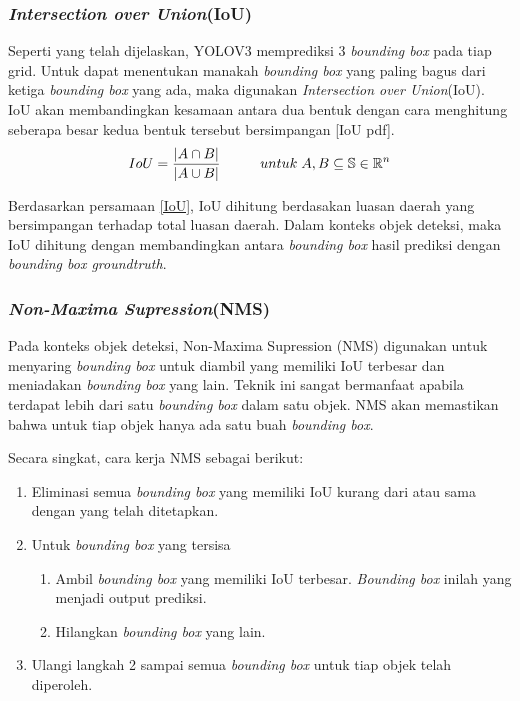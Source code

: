 \documentclass[../thesis.tex]{subfiles}
\begin{document}
\subsubsection{\textit{Intersection over Union}(IoU)}
Seperti yang telah dijelaskan, YOLOV3 memprediksi 3 \textit{bounding box} pada tiap grid. Untuk dapat menentukan manakah \textit{bounding box} yang paling bagus dari ketiga \textit{bounding box} yang ada, maka digunakan \textit{Intersection over Union}(IoU). 
IoU akan membandingkan kesamaan antara dua bentuk dengan cara menghitung seberapa besar kedua bentuk tersebut bersimpangan [IoU pdf].
\begin{equation} \label{IoU}
	IoU = \frac{|A \cap B|}{|A \cup B|}	\hspace{10mm} untuk \hspace{1mm}A,B \subseteq \mathbb{S} \in \mathbb{R}^n
\end{equation}

Berdasarkan persamaan \ref{IoU}, IoU dihitung berdasakan luasan daerah yang bersimpangan terhadap total luasan daerah.
Dalam konteks objek deteksi, maka IoU dihitung dengan membandingkan antara \textit{bounding box} hasil prediksi dengan \textit{bounding box groundtruth}.

\subsubsection{\textit{Non-Maxima Supression}(NMS)}
Pada konteks objek deteksi, Non-Maxima Supression (NMS) digunakan untuk menyaring \textit{bounding box} untuk diambil yang memiliki IoU terbesar dan meniadakan \textit{bounding box} yang lain. 
Teknik ini sangat bermanfaat apabila terdapat lebih dari satu \textit{bounding box} dalam satu objek. NMS akan memastikan bahwa untuk tiap objek hanya ada satu buah \textit{bounding box}. 

Secara singkat, cara kerja NMS sebagai berikut:
\begin{enumerate}
	\item Eliminasi semua \textit{bounding box} yang memiliki IoU kurang dari atau sama dengan yang telah ditetapkan.
	\item Untuk \textit{bounding box} yang tersisa
	\begin{enumerate}
		\item Ambil \textit{bounding box} yang memiliki IoU terbesar. \textit{Bounding box} inilah yang menjadi output prediksi.
		\item Hilangkan \textit{bounding box} yang lain.
	\end{enumerate}
	\item Ulangi langkah 2 sampai semua \textit{bounding box} untuk tiap objek telah diperoleh.
\end{enumerate}
\end{document}
